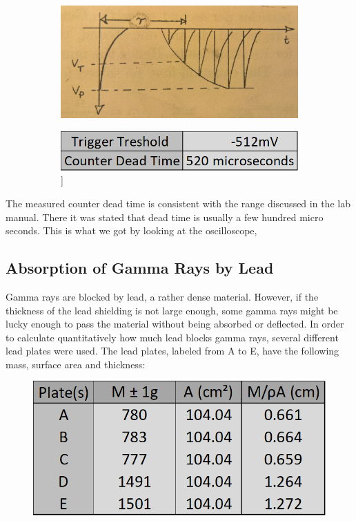 \documentclass[a4paper]{article}
\begin{document}
  \begin{figure}[h]
  \centering
  \begin{subfigure}[h]{0.4\linewidth}
  \includegraphics[width=\linewidth]{deadtime}
  \end{subfigure}
  \begin{subfigure}[h]{0.4\linewidth}
  \includegraphics[width=\linewidth]{measureddeadtime}]
  \end{subfigure}
  \end{figure}
  
  The measured counter dead time is consistent with the range discussed in the lab manual. There it was stated that dead time is usually a few hundred micro seconds. This is what we got by looking at the oscilloscope, 
 
 \subsection{Absorption of Gamma Rays by Lead}
 Gamma rays are blocked by lead, a rather dense material. However, if the thickness of the lead shielding is not large enough, some gamma rays might be lucky enough to pass the material without being absorbed or deflected. In order to calculate quantitatively how much lead blocks gamma rays, several different lead plates were used. The lead plates, labeled from A to E, have the following mass, surface area and thickness:
  
 \begin{figure}[h]
  \includegraphics[scale=1.5]{plates} 
  \centering
  \end{figure}
  
\end{document}
